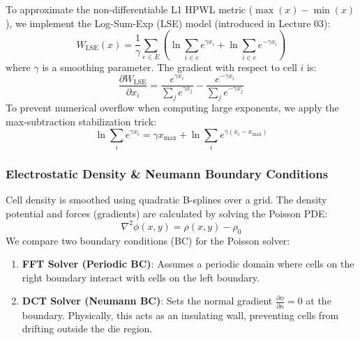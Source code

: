 \documentclass[10pt, twocolumn]{article}
\begin{document}
To approximate the non-differentiable L1 HPWL metric ($\max(x) - \min(x)$), we implement the Log-Sum-Exp (LSE) model (introduced in Lecture 03):
\begin{equation}
W_{\text{LSE}}(x) = \frac{1}{\gamma} \sum_{e \in E} \left( \ln \sum_{i \in e} e^{\gamma x_i} + \ln \sum_{i \in e} e^{-\gamma x_i} \right)
\end{equation}
where $\gamma$ is a smoothing parameter. The gradient with respect to cell $i$ is:
\begin{equation}
\frac{\partial W_{\text{LSE}}}{\partial x_i} = \frac{e^{\gamma x_i}}{\sum_{j} e^{\gamma x_j}} - \frac{e^{-\gamma x_i}}{\sum_{j} e^{-\gamma x_j}}
\end{equation}
To prevent numerical overflow when computing large exponents, we apply the max-subtraction stabilization trick:
\begin{equation}
\ln \sum_i e^{\gamma x_i} = \gamma x_{\max} + \ln \sum_i e^{\gamma(x_i - x_{\max})}
\end{equation}

\subsubsection{Electrostatic Density \& Neumann Boundary Conditions}
Cell density is smoothed using quadratic B-splines over a grid. The density potential and forces (gradients) are calculated by solving the Poisson PDE:
\begin{equation}
\nabla^2 \phi(x,y) = \rho(x,y) - \rho_0
\end{equation}
We compare two boundary conditions (BC) for the Poisson solver:
\begin{enumerate}
\item \textbf{FFT Solver (Periodic BC)}: Assumes a periodic domain where cells on the right boundary interact with cells on the left boundary.
\item \textbf{DCT Solver (Neumann BC)}: Sets the normal gradient $\frac{\partial \phi}{\partial n} = 0$ at the boundary. Physically, this acts as an insulating wall, preventing cells from drifting outside the die region.
\end{enumerate}
\end{document}
